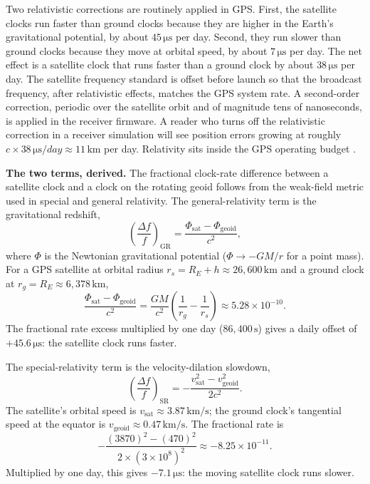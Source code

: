 Two relativistic corrections are routinely applied in GPS. First,
the satellite clocks run faster than ground clocks because they
are higher in the Earth's gravitational potential, by about
$45 \,\si{\micro\second}$ per day. Second, they run slower than
ground clocks because they move at orbital speed, by about
$7 \,\si{\micro\second}$ per day. The net effect is a satellite
clock that runs faster than a ground clock by about
$38 \,\si{\micro\second}$ per day. The satellite frequency standard
is offset before launch so that the broadcast frequency, after
relativistic effects, matches the GPS system rate. A second-order
correction, periodic over the satellite orbit and of magnitude
tens of nanoseconds, is applied in the receiver firmware. A reader
who turns off the relativistic correction in a receiver simulation
will see position errors growing at roughly $c \times 38 \,\si
{\micro\second\per day} \approx 11 \,\si{\kilo\meter}$ per day.
Relativity sits inside the GPS operating budget
\cite{std:gps-sps-2020}.

\textbf{The two terms, derived.} The fractional clock-rate
difference between a satellite clock and a clock on the rotating
geoid follows from the weak-field metric used in special and
general relativity. The general-relativity term is the
gravitational redshift,
\[
\left( \frac{\Delta f}{f} \right)_{\text{GR}}
= \frac{\Phi_{\text{sat}} - \Phi_{\text{geoid}}}{c^{2}},
\]
where $\Phi$ is the Newtonian gravitational potential ($\Phi \to
-GM/r$ for a point mass). For a GPS satellite at orbital radius
$r_{s} = R_{E} + h \approx 26{,}600 \,\si{\kilo\meter}$ and a
ground clock at $r_{g} = R_{E} \approx 6{,}378 \,\si{\kilo\meter}$,
\[
\frac{\Phi_{\text{sat}} - \Phi_{\text{geoid}}}{c^{2}}
= \frac{GM}{c^{2}} \left( \frac{1}{r_{g}} - \frac{1}{r_{s}} \right)
\approx 5.28 \times 10^{-10}.
\]
The fractional rate excess multiplied by one day ($86{,}400 \,\si
{\second}$) gives a daily offset of $+45.6 \,\si{\micro\second}$:
the satellite clock runs faster.

The special-relativity term is the velocity-dilation slowdown,
\[
\left( \frac{\Delta f}{f} \right)_{\text{SR}}
= -\frac{v_{\text{sat}}^{2} - v_{\text{geoid}}^{2}}{2 c^{2}}.
\]
The satellite's orbital speed is $v_{\text{sat}} \approx 3.87 \,\si
{\kilo\meter\per\second}$; the ground clock's tangential speed at
the equator is $v_{\text{geoid}} \approx 0.47 \,\si{\kilo\meter
\per\second}$. The fractional rate is
\[
-\frac{(3870)^{2} - (470)^{2}}{2 \times (3 \times 10^{8})^{2}}
\approx -8.25 \times 10^{-11}.
\]
Multiplied by one day, this gives $-7.1 \,\si{\micro\second}$: the
moving satellite clock runs slower.


